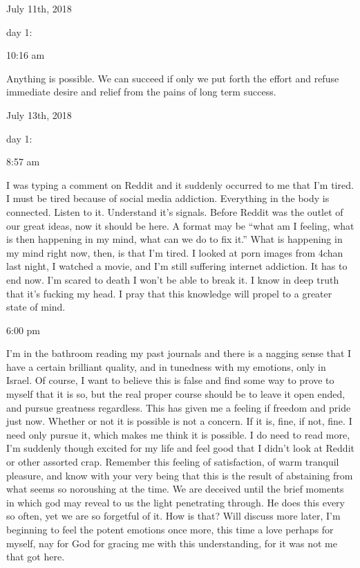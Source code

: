 \bigskip
\bigskip
July 11th, 2018

day 1:

10:16 am

Anything is possible. We can succeed if only we put forth the effort and
refuse immediate desire and relief from the pains of long term success.

\bigskip
\bigskip
July 13th, 2018

day 1:

8:57 am

I was typing a comment on Reddit and it suddenly occurred to me that I'm
tired. I must be tired because of social media addiction. Everything in
the body is connected. Listen to it. Understand it's signals. Before
Reddit was the outlet of our great ideas, now it should be here. A
format may be ``what am I feeling, what is then happening in my mind,
what can we do to fix it.'' What is happening in my mind right now,
then, is that I'm tired. I looked at porn images from 4chan last night,
I watched a movie, and I'm still suffering internet addiction. It has to
end now. I'm scared to death I won't be able to break it. I know in deep
truth that it's fucking my head. I pray that this knowledge will propel
to a greater state of mind.

6:00 pm

I'm in the bathroom reading my past journals and there is a nagging
sense that I have a certain brilliant quality, and in tunedness with my
emotions, only in Israel. Of course, I want to believe this is false and
find some way to prove to myself that it is so, but the real proper
course should be to leave it open ended, and pursue greatness
regardless. This has given me a feeling if freedom and pride just now.
Whether or not it is possible is not a concern. If it is, fine, if not,
fine. I need only pursue it, which makes me think it is possible. I do
need to read more, I'm suddenly though excited for my life and feel good
that I didn't look at Reddit or other assorted crap. Remember this
feeling of satisfaction, of warm tranquil pleasure, and know with your
very being that this is the result of abstaining from what seems so
noroushing at the time. We are deceived until the brief moments in which
god may reveal to us the light penetrating through. He does this every
so often, yet we are so forgetful of it. How is that? Will discuss more
later, I'm beginning to feel the potent emotions once more, this time a
love perhaps for myself, nay for God for gracing me with this
understanding, for it was not me that got here.

